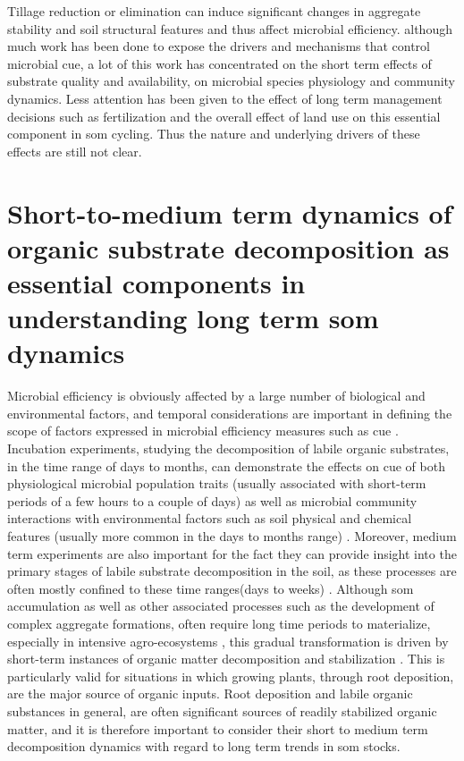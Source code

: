 		Tillage reduction or elimination can induce significant changes in aggregate stability and soil structural features \citep{alvaro-fuentes2009, barreto2009} and thus affect microbial efficiency.
		although much work has been done to expose the drivers and mechanisms that control microbial \gls{cue}, a lot of this work has concentrated on the short term effects of substrate quality and availability, on microbial species physiology and community dynamics. Less attention has been given to the effect of long term management decisions such as fertilization and the overall effect of land use on this essential component in \gls{som} cycling. Thus the nature and underlying drivers of these effects are still not clear.

\section{Short-to-medium term dynamics of organic substrate decomposition as essential components in understanding long term \gls{som} dynamics}

		Microbial efficiency is obviously affected by a large number of biological and environmental factors, and temporal considerations are important in defining the scope of factors expressed in microbial efficiency measures such as \gls{cue} \citep{kallenbach2019}. Incubation experiments, studying the decomposition of labile organic substrates, in the time range of days to months,  can demonstrate the effects on \gls{cue} of both physiological microbial population traits (usually associated with short-term periods of a few hours to a couple of days) as well as microbial community interactions with environmental factors such as soil physical and chemical features (usually more common in the days to months range) \citep{geyer2016, manzoni2018}. Moreover, medium term experiments are also important for the fact they can provide insight into the primary stages of labile substrate decomposition in the soil, as these processes are often mostly confined to these time ranges(days to weeks) \citep{blagodatskaya2011, schneckenberger2008, tian2015}. Although \gls{som} accumulation as well as other associated processes such as the development of complex aggregate formations, often require long time periods to materialize, especially in intensive agro-ecosystems \citep{grandy2007}, this gradual transformation is driven by short-term instances of organic matter decomposition and stabilization \citep{kuzyakov2015}. This is particularly valid for situations in which growing plants, through root deposition, are the major source of organic inputs. Root deposition and labile organic substances in general, are often significant sources of readily stabilized organic matter, and it is therefore important to consider their short to medium term decomposition dynamics with regard to long term trends in \gls{som} stocks.


